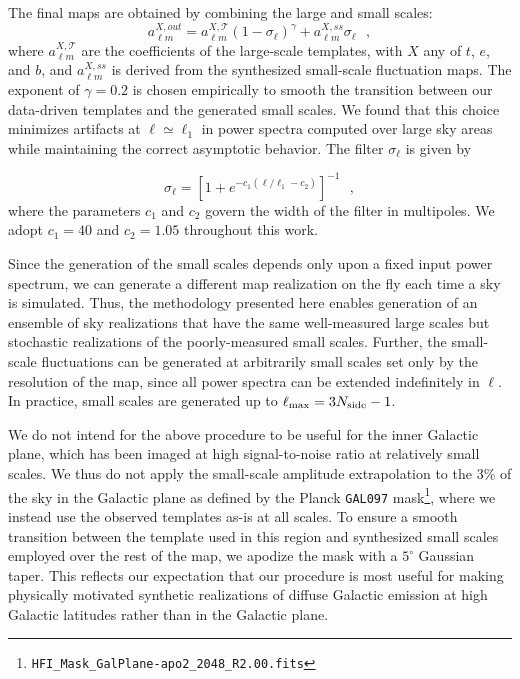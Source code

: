 \documentclass[twocolumn]{aastex631}
\begin{document}
The final maps are obtained by combining the large and small scales: 
\begin{equation} \label{eq:filter}
    a_{\ell m }^{X, out}=  a_{\ell m }^{X, \mathcal{T}} \left(1-\sigma_\ell\right)^{\gamma} + a_{\ell m }^{X, ss} \sigma_\ell
    ~~~, 
\end{equation}
where $a_{\ell m }^{X, \mathcal{T}}$ are the coefficients of the large-scale templates, with $X$ any of $t$, $e$, and $b$, and $a_{\ell m }^{X, ss}$ is derived from the synthesized small-scale fluctuation maps. The exponent of $\gamma = 0.2$ is chosen empirically to smooth the transition between our data-driven templates and the generated small scales. We found that this choice minimizes artifacts at $\ell \simeq \ell_1$ in power spectra computed over large sky areas while maintaining the correct asymptotic behavior. The filter $\sigma_\ell$ is given by

\begin{equation} \label{eq:filter2}
\sigma_\ell  = \left[1+  e^{ -c_1 (\ell/ \ell_1  -c_2 )}\right]^{-1}  
~~~,
\end{equation}
where the parameters $c_1$ and $c_2$ govern the width of the filter in multipoles. We adopt $c_1=40$ and $c_2=1.05$ throughout this work.

Since the generation of the small scales depends only upon a fixed input power spectrum, we can generate a different map realization on the fly each time a sky is simulated. Thus, the methodology presented here enables generation of an ensemble of sky realizations that have the same well-measured large scales but stochastic realizations of the poorly-measured small scales. Further, the small-scale fluctuations can be generated at arbitrarily small scales set only by the resolution of the map, since all power spectra can be extended indefinitely in $\ell$. In practice, small scales are generated up to $\ell_{\rm max} = 3N_{\rm side}-1$.

We do not intend for the above procedure to be useful for the inner Galactic plane, which has been imaged at high signal-to-noise ratio at relatively small scales. We thus do not apply the small-scale amplitude extrapolation to the $3\%$ of the sky in the Galactic plane as defined by the Planck \texttt{GAL097} mask\footnote{\texttt{HFI\_Mask\_GalPlane-apo2\_2048\_R2.00.fits}}, where we instead use the observed templates as-is at all scales. To ensure a smooth transition between the template used in this region and synthesized small scales employed over the rest of the map, we apodize the mask with a $5^\circ$ Gaussian taper. This reflects our expectation that our procedure is most useful for making physically motivated synthetic realizations of diffuse Galactic emission at high Galactic latitudes rather than in the Galactic plane.
\end{document}
